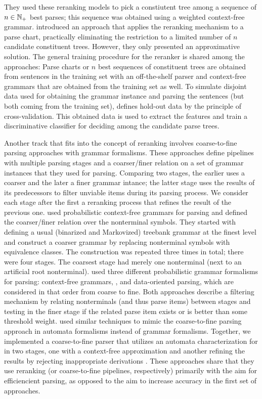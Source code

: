 \documentclass[../document.tex]{subfiles}
\begin{document}
    They used these reranking models to pick a constiutent tree among a sequence of \(n \in \mathbb{N}_+\) best parses; this sequence was obtained using a weighted context-free grammar.
     introduced an approach that applies the reranking mechanism to a parse chart, practically eliminating the restriction to a limited number of \(n\) candidate constituent trees.
    However, they only presented an approximative solution.
    The general training procedure for the reranker is shared among the approaches:
        Parse charts or \(n\) best sequences of constituent trees are obtained from sentences in the training set with an off-the-shelf parser and context-free grammars that are obtained from the training set as well.
        To simulate disjoint data used for obtaining the grammar instance and parsing the sentences (but both coming from the training set), \citeauthor{huang2008forest} defines hold-out data by the principle of cross-validation.
        This obtained data is used to extract the features and train a discriminative classifier for deciding among the candidate parse trees.

    Another track that fits into the concept of reranking involves coarse-to-fine parsing approaches with grammar formalisms.
    These approaches define pipelines with multiple parsing stages and a coarser/finer relation on a set of grammar instances that they used for parsing.
    Comparing two stages, the earlier uses a coarser and the later a finer grammar intance; the latter stage uses the results of its predecessors to filter unviable items during its parsing process.
    We consider each stage after the first a reranking process that refines the result of the previous one.
     used probabilistic context-free grammars for parsing and defined the coarser/finer relation over the nonterminal symbols.
    They started with defining a usual (binarized and Markovized) treebank grammar at the finest level and construct a coarser grammar by replacing nonterminal symbols with equivalence classes.
    The construction was repeated three times in total; there were four stages.
    The coarsest stage had merely one nonterminal (next to an artificial root nonterminal).
     used three different probabilistic grammar formalisms for parsing: context-free grammars, , and data-oriented parsing, which are considered in that order from coarse to fine.
    Both approaches describe a filtering mechanism by relating nonterminals (and thus parse items) between stages and testing in the finer stage if the related parse item exists or is better than some threshold weight.
     used similar techniques to mimic the coarse-to-fine parsing approach in automata formalisms instead of grammar formalisms.
    Together, we implemented a coarse-to-fine parser that utilizes an automata characterization for  in two stages, one with a context-free approximation and another refining the results by rejecting inappropriate derivations \citep{RupDen19}.
    These approaches share that they use reranking (or coarse-to-fine pipelines, respectively) primarily with the aim for efficiencient parsing, as opposed to the aim to increase accuracy in the first set of approaches.
\end{document}
